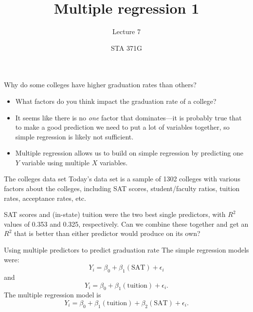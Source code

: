 \documentclass{beamer}\usepackage[]{graphicx}\usepackage[]{color}
\title{Multiple regression 1}
\subtitle{Lecture 7}
\author{STA 371G}
\begin{document}
  
  

  \frame{\maketitle}



  \begin{darkframes}
    \begin{frame}{Why do some colleges have higher graduation rates than others?}
      \begin{itemize}[<+->]
        \item What factors do you think impact the graduation rate of a college?
        \item It seems like there is no \emph{one} factor that dominates---it is probably true that to make a good prediction we need to put a lot of variables together, so simple regression is likely not sufficient.
        \item \alert{Multiple regression} allows us to build on simple regression by predicting one $Y$ variable using multiple $X$ variables.
      \end{itemize}
    \end{frame}

    \begin{frame}{The colleges data set}
      Today's data set is a sample of 1302 colleges with various factors about the colleges, including SAT scores, student/faculty ratios, tuition rates, acceptance rates, etc.
    \end{frame}

    \begin{frame}[fragile]

      \begin{center}
        SAT scores and (in-state) tuition were the two best single predictors, with $R^2$ values of 0.353 and 0.325, respectively. Can we combine these together and get an $R^2$ that is better than either predictor would produce on its own?
      \end{center}
    \end{frame}

    \begin{frame}{Using multiple predictors to predict graduation rate}
      The simple regression models were:
      \[
        Y_i = \beta_0 + \beta_1 (\text{SAT}) + \epsilon_i
      \]
      and
      \[
        Y_i = \beta_0 + \beta_1 (\text{tuition}) + \epsilon_i.
      \]
      The multiple regression model is
      \[
        Y_i = \beta_0 + \beta_1 (\text{tuition}) + \beta_2 (\text{SAT}) + \epsilon_i.
      \]
    \end{frame}


\end{darkframes}
\end{document}
